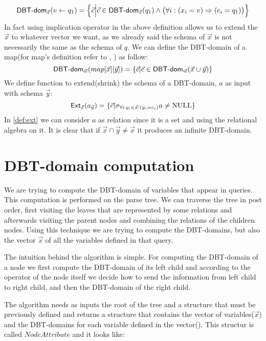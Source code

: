 \documentclass[12pt]{article}
\begin{document}
\begin{equation}
\label{assign2}
\text{\textsf{DBT-dom}{}}_{\vec{x}}(v\gets q_{1})=\Big\{\vec{c}\Big|\vec{c}\in\text{\textsf{DBT-dom}{}}_{\vec{x}}(q_{1})\land \big(\forall i: (x_{i}=v)\Rightarrow(c_{i}=q_{1})\big)\Big\}
\end{equation}
In fact using implication operator in the above definition allows us to extend the $\vec{x}$ to whatever vector we want, as we already said the schema of $\vec{x}$ is not necessarily the same as the schema of $q$. %
We can define the DBT-domain of a map(for map's definition refer to \cite{1}, \cite{2}) as follow:
\begin{equation}
\label{def:map}
\text{\textsf{DBT-dom}}_{\vec{w}}(map[\vec{x}][\vec{y}])=\{\vec{c}|\vec{c}\in\text{\textsf{DBT-dom}}_{\vec{w}}(\vec{x}\cup\vec{y})\}
\end{equation}
We define function \Ext{}  to extend(shrink) the schema of a DBT-domain, $a$ as input with schema $\vec{y}$:
\begin{equation}
\label{def:ext}
\text{\textsf{Ext}}_{\vec{x}}(a_{\vec{y}})=\{\vec{c}|\sigma_{\forall i\,y_{i}\in\vec{x}:(y_{i}=c_{i})}a\neq \text{NULL}\}
\end{equation}
In \eqref{def:ext} we can consider $a$ as relation since it is a set and using the relational algebra on it. 
It is clear that if $\vec{x}\cap\vec{y}\neq\vec{x}$ it produces an infinite DBT-domain. 

\section{DBT-domain computation}

We are trying to compute the DBT-domain of variables that appear in queries. This computation is performed on the parse tree. We can traverse the tree in post order, first visiting the leaves that are represented by some relations and afterwards visiting the parent nodes and combining the relations of the children nodes. Using this technique we are trying to compute the DBT-domains, but also the vector $\vec x$ of all the variables defined in that query.

The intuition behind the algorithm is simple. For computing the DBT-domain of a node we first compute the DBT-domain of its left child and according to the operator of the node itself we decide how to send the information from left child to right child, and then the DBT-domain of the right child.

The algorithm needs as inputs the root of the tree and a structure that must be previously defined and returns a structure that contains the vector of variables($\vec{x}$) and the DBT-domains for each variable defined in the vector(\dom). This structur is called $NodeAttribute$ and it looks like:
\end{document}
